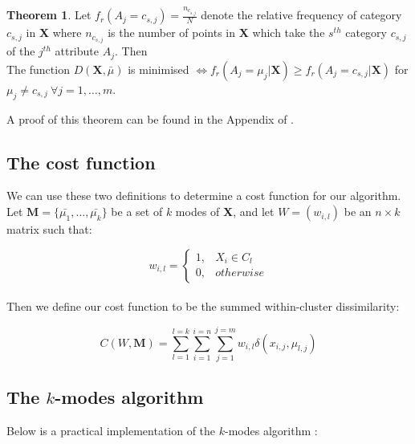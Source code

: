 \documentclass{article}
\theoremstyle{definition}
\newtheorem{theorem}{Theorem}
\begin{document}
\begin{theorem}\label{theorem:1}
Let $f_r(A_j = c_{s,j}) = \frac{n_{c_{s,j}}}{N}$ denote the relative frequency of category $c_{s,j}$ in \textbf{X} where $n_{c_{s,j}}$ is the number of points in \textbf{X} which take the $s^{th}$ category $c_{s,j}$ of the $j^{th}$ attribute $A_j$. Then \\

The function $D(\textbf{X}, \bar{\mu})$ is minimised $\iff f_r(A_j = \mu_j | \textbf{X}) \geq f_r(A_j = c_{s,j} | \textbf{X})$ for $\mu_j \neq c_{s,j} \ \forall j = 1, \ldots, m$. \\
\end{theorem}

A proof of this theorem can be found in the Appendix of \cite{Huang98}. \\


\subsection{The cost function}\label{subsection:cost}

We can use these two definitions to determine a cost function for our algorithm. Let $\textbf{M} = \{\bar{\mu_1}, \ldots, \bar{\mu_k}\}$ be a set of $k$ modes of \textbf{X}, and let $W = (w_{i,l})$ be an $n \times k$ matrix such that:

\[ 
w_{i,l} = \begin{cases}
                1, & X_i \in C_l \\
                0, & otherwise
          	 \end{cases}
\] \\

Then we define our cost function to be the summed within-cluster dissimilarity:

\begin{equation}
	C(W, \textbf{M}) = \sum_{l=1}^{l=k}\sum_{i=1}^{i=n}\sum_{j=1}^{j=m} w_{i,l} \delta(x_{i,j}, \mu_{l,j}) 
\end{equation}


\subsection{The $k$-modes algorithm}\label{subsection:kmodes}

Below is a practical implementation of the $k$-modes algorithm \cite{Huang98}:
\end{document}
